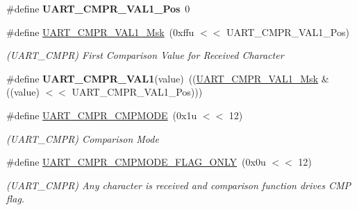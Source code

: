 \begin{DoxyCompactItemize}
\#define {\bfseries U\+A\+R\+T\+\_\+\+C\+M\+P\+R\+\_\+\+V\+A\+L1\+\_\+\+Pos}~0
\item 
\mbox{\label{group__SAMS70__UART_ga0e053dfa63c58565b9fb601ce05c428e}} 
\#define \mbox{\hyperlink{group__SAMS70__UART_ga0e053dfa63c58565b9fb601ce05c428e}{U\+A\+R\+T\+\_\+\+C\+M\+P\+R\+\_\+\+V\+A\+L1\+\_\+\+Msk}}~(0xffu $<$$<$ U\+A\+R\+T\+\_\+\+C\+M\+P\+R\+\_\+\+V\+A\+L1\+\_\+\+Pos)
\begin{DoxyCompactList}\small\item\em (U\+A\+R\+T\+\_\+\+C\+M\+PR) First Comparison Value for Received Character \end{DoxyCompactList}\item 
\mbox{\label{group__SAMS70__UART_ga67aecc6cc421d4ec4e12eff53d634b1c}} 
\#define {\bfseries U\+A\+R\+T\+\_\+\+C\+M\+P\+R\+\_\+\+V\+A\+L1}(value)~((\mbox{\hyperlink{group__SAMV71__UART_ga0e053dfa63c58565b9fb601ce05c428e}{U\+A\+R\+T\+\_\+\+C\+M\+P\+R\+\_\+\+V\+A\+L1\+\_\+\+Msk}} \& ((value) $<$$<$ U\+A\+R\+T\+\_\+\+C\+M\+P\+R\+\_\+\+V\+A\+L1\+\_\+\+Pos)))
\item 
\mbox{\label{group__SAMS70__UART_gacfa8a3d1af798747e81691a0d09ccd6e}} 
\#define \mbox{\hyperlink{group__SAMS70__UART_gacfa8a3d1af798747e81691a0d09ccd6e}{U\+A\+R\+T\+\_\+\+C\+M\+P\+R\+\_\+\+C\+M\+P\+M\+O\+DE}}~(0x1u $<$$<$ 12)
\begin{DoxyCompactList}\small\item\em (U\+A\+R\+T\+\_\+\+C\+M\+PR) Comparison Mode \end{DoxyCompactList}\item 
\mbox{\label{group__SAMS70__UART_ga3b80a108593c4965e009a22c467b98b9}} 
\#define \mbox{\hyperlink{group__SAMS70__UART_ga3b80a108593c4965e009a22c467b98b9}{U\+A\+R\+T\+\_\+\+C\+M\+P\+R\+\_\+\+C\+M\+P\+M\+O\+D\+E\+\_\+\+F\+L\+A\+G\+\_\+\+O\+N\+LY}}~(0x0u $<$$<$ 12)
\begin{DoxyCompactList}\small\item\em (U\+A\+R\+T\+\_\+\+C\+M\+PR) Any character is received and comparison function drives C\+MP flag. \end{DoxyCompactList}\item 
\mbox{\label{group__SAMS70__UART_ga150f46983b40fcaa87d327062197971b}} 

\end{DoxyCompactItemize}
